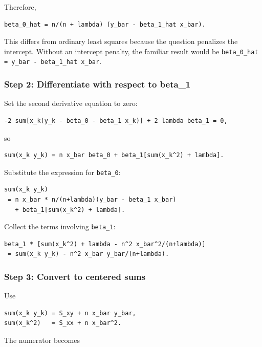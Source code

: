 ﻿\documentclass[11pt]{article}
\begin{document}
Therefore,

\begin{lstlisting}
beta_0_hat = n/(n + lambda) (y_bar - beta_1_hat x_bar).
\end{lstlisting}

This differs from ordinary least squares because the question penalizes the
intercept. Without an intercept penalty, the familiar result would be
\texttt{beta\_0\_hat = y\_bar - beta\_1\_hat x\_bar}.

\subsubsection{Step 2: Differentiate with respect to beta\_1}

Set the second derivative equation to zero:

\begin{lstlisting}
-2 sum[x_k(y_k - beta_0 - beta_1 x_k)] + 2 lambda beta_1 = 0,
\end{lstlisting}

so

\begin{lstlisting}
sum(x_k y_k) = n x_bar beta_0 + beta_1[sum(x_k^2) + lambda].
\end{lstlisting}

Substitute the expression for \texttt{beta\_0}:

\begin{lstlisting}
sum(x_k y_k)
 = n x_bar * n/(n+lambda)(y_bar - beta_1 x_bar)
   + beta_1[sum(x_k^2) + lambda].
\end{lstlisting}

Collect the terms involving \texttt{beta\_1}:

\begin{lstlisting}
beta_1 * [sum(x_k^2) + lambda - n^2 x_bar^2/(n+lambda)]
 = sum(x_k y_k) - n^2 x_bar y_bar/(n+lambda).
\end{lstlisting}

\subsubsection{Step 3: Convert to centered sums}

Use

\begin{lstlisting}
sum(x_k y_k) = S_xy + n x_bar y_bar,
sum(x_k^2)   = S_xx + n x_bar^2.
\end{lstlisting}

The numerator becomes
\end{document}
